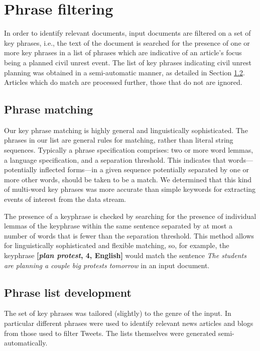 \section{Phrase filtering}
In order to identify relevant documents, input documents are filtered on a set of key phrases, i.e.,
the text of the document is searched for the presence of one or
more key phrases in a list of phrases which are indicative of an article's focus being
a planned civil unrest event.  
The list of key phrases indicating civil unrest planning was obtained
in a semi-automatic manner, as detailed in Section \ref{sec:phraselearning}.
Articles which do match are processed further, those that do not are ignored.

\subsection{Phrase matching}
Our key phrase matching is highly general and linguistically
sophisticated.  The phrases in our list are general rules for
matching, rather than literal string sequences. Typically a phrase
specification comprises: two or more word lemmas, a language
specification, and a separation threshold. This indicates that words---potentially inflected forms---in 
a given sequence potentially separated by one or more other words, should be taken to be a
match. We determined that this kind of
multi-word key phrases was more accurate than simple keywords for
extracting events of interest from the data stream.

The presence of a keyphrase is checked by searching for the presence of
individual lemmas of the keyphrase within the same sentence separated
by at most a number of words that is fewer than the separation threshold.  
This method allows for linguistically sophisticated and flexible matching, so, for example,
the keyphrase {\bf [{\em plan protest}, 4, English]} would match the sentence
{\em The students are planning a couple big protests tomorrow} in an input document.

\subsection{Phrase list development}
\label{sec:phraselearning}
The set of key phrases was tailored (slightly) to the genre of the
input. In particular different phrases were used to identify relevant
news articles and blogs from those used to filter Tweets.  The lists
themselves were generated semi-automatically.

